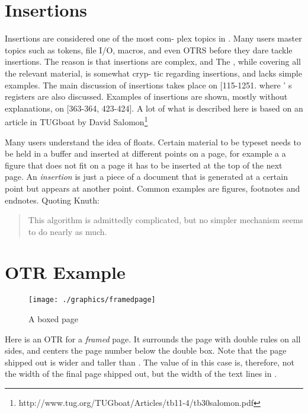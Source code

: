 \section{Insertions}
Insertions are considered one of  the most  com- 
plex  topics in \tex. Many users master  topics  such 
as tokens,  file  I/O, macros,  and  even  OTRS  before 
they dare  tackle  insertions.  The  reason  is  that 
insertions  are  complex,  and  The \texbook, while 
covering all the relevant material, is somewhat cryp- 
tic regarding  insertions, and  lacks  simple examples. 
The  main  discussion  of  insertions takes  place  on 
[115-1251.  where \tex' s  registers  are also discussed. 
Examples  of  insertions are  shown, mostly  without 
explanations,  on  [363-364,  423-424].  A lot of what is described here is based on an article in TUGboat by David Salomon\footnote{ 
http://www.tug.org/TUGboat/Articles/tb11-4/tb30salomon.pdf}

Many users understand the idea of floats. Certain material to be typeset needs to be held in a buffer and inserted at different points on a page, for example a a figure that does not fit on a page it has to be inserted at the top of the next page. An \textit{insertion} is just a piece of a document that is generated at a certain point but appears at another point. Common examples are figures, footnotes and endnotes. Quoting Knuth:

\begin{quote}
  This  algorithm  is  admittedly  complicated, 
but  no  simpler  mechanism  seems  to  do  nearly 
as  much.
\end{quote}

\section{OTR Example}

\begin{figure}%
 \centering
  \texttt{[image: ./graphics/framedpage]}
  \caption{A boxed page}
  \label{fig:framedpage}
\end{figure}

Here is an OTR for a \textit{framed} page. It surrounds the
page with double rules on all sides, and centers the
page number below the double box. Note that the
page shipped out is wider and taller than .
The value of  in this case is, therefore, not
the width of the final page shipped out, but the
width of the text lines in .

